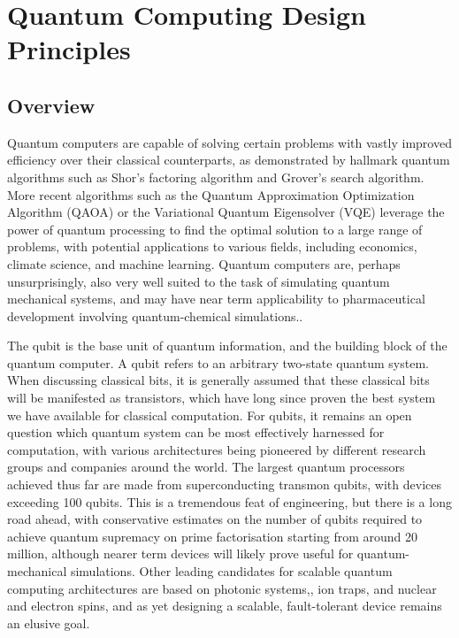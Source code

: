 \documentclass[../Thesis.tex]{subfiles}
\begin{document}
\chapter{Quantum Computing Design Principles}

\section{Overview}
Quantum computers are capable of solving certain problems with vastly improved efficiency over their classical counterparts, as demonstrated by hallmark quantum algorithms such as Shor's factoring algorithm\cite{shor_polynomial-time_1997} and Grover's search algorithm\cite{grover_fast_1996}. %
More recent algorithms such as the Quantum Approximation Optimization Algorithm (QAOA) or the Variational Quantum Eigensolver (VQE) leverage the power of quantum processing to find the optimal solution to a large range of problems, with potential applications to various fields, including economics, climate science, and machine learning\cite{farhi_quantum_2014}. Quantum computers are, perhaps unsurprisingly, also very well suited to the task of simulating quantum mechanical systems, and may have near term applicability to pharmaceutical development involving quantum-chemical simulations.\cite{preskill_quantum_2021,lloyd_universal_1996}.  %

The qubit is the base unit of quantum information, and the building block of the quantum computer. A qubit refers to an arbitrary two-state quantum system. When discussing classical bits, it is generally assumed that these classical bits will be manifested as transistors, which have long since proven the best system we have available for classical computation. For qubits, it remains an open question which quantum system can be most effectively harnessed for computation, with various architectures being pioneered by different research groups and companies around the world.  The largest quantum processors achieved thus far are made from superconducting transmon qubits\cite{krantz_quantum_2019}, with devices exceeding 100 qubits\cite{ball_first_2021}. This is a tremendous feat of engineering, but there is a long road ahead, with conservative estimates on the number of qubits required to achieve quantum supremacy on prime factorisation starting from around 20 million\cite{gidney_how_2021}, although nearer term devices will likely prove useful for quantum-mechanical simulations\cite{childs_toward_2018}. Other leading candidates for scalable quantum computing architectures are based on photonic systems,\cite{slussarenko_photonic_2019}, ion traps\cite{bruzewicz_trapped-ion_2019}, and nuclear and electron spins\cite{vandersypen_interfacing_2017}, and as yet designing a scalable, fault-tolerant device remains an elusive goal.
\end{document}
